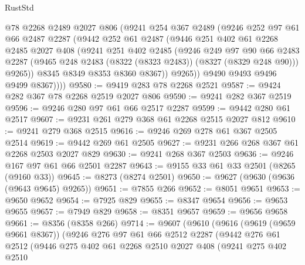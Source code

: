 \begin{lexlean}{RustStd}
\begin{coremodule}
            @78
            @2268
            @2489
            @2027
            @806
            (@9241
              @254
              @367
              @2489
              (@9246
                @252
                @97
                @61
                @66
                @2487
                @2287
                (@9442
                  @252
                  @61
                  @2487
                  (@9446
                    @251
                    @402
                    @61
                    @2268
                    @2485
                    @2027
                    @408
                    (@9241
                      @251
                      @402
                      @2485
                      (@9246
                        @249
                        @97
                        @90
                        @66
                        @2483
                        @2287
                        (@9465 @248 @2483 (@8322 (@8323 @2483)) (@8327 (@8329 @248 @90)))
                        @9265))
                    @8345
                    @8349
                    @8353
                    @8360
                    @8367))
                @9265))
            @9490
            @9493
            @9496
            @9499
            @8367))))
@9580 := @9419 @283 @78 @2268 @2521
@9587 := @9424 @282 @367 @78 @2268 @2519 @2027 @806
@9590 := @9241 @282 @367 @2519
@9596 := @9246 @280 @97 @61 @66 @2517 @2287
@9599 := @9442 @280 @61 @2517
@9607 := @9231 @261 @279 @368 @61 @2268 @2515 @2027 @812
@9610 := @9241 @279 @368 @2515
@9616 := @9246 @269 @278 @61 @367 @2505 @2514
@9619 := @9442 @269 @61 @2505
@9627 := @9231 @266 @268 @367 @61 @2268 @2503 @2027 @829
@9630 := @9241 @268 @367 @2503
@9636 := @9246 @167 @97 @61 @66 @2501 @2287
@9643 := @9155 @33 @61 @33 @2501 (@8265 (@9160 @33))
@9645 := @8273 (@8274 @2501)
@9650 := @9627 (@9630 (@9636 (@9643 @9645) @9265))
@9651 := @7855 @266
@9652 := @8051 @9651
@9653 := @9650 @9652
@9654 := @7925 @829
@9655 := @8347 @9654
@9656 := @9653 @9655
@9657 := @7949 @829
@9658 := @8351 @9657
@9659 := @9656 @9658
@9661 := @8356 (@8358 @266)
@9714 := @9607
    (@9610
      (@9616
        (@9619 (@9659 @9661 @8367))
        (@9246
          @276
          @97
          @61
          @66
          @2512
          @2287
          (@9442
            @276
            @61
            @2512
            (@9446
              @275
              @402
              @61
              @2268
              @2510
              @2027
              @408
              (@9241
                @275
                @402
                @2510

\end{coremodule}
\end{lexlean}
